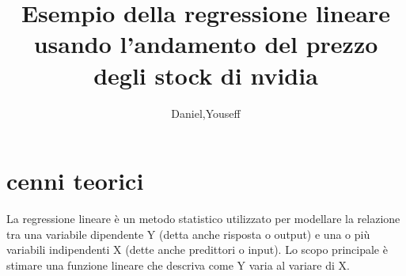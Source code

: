\documentclass[12pt]{article}
\author{Daniel,Youseff}
\title{Esempio della regressione lineare usando l'andamento del prezzo degli stock di nvidia}
\begin{document}
\maketitle
\section{cenni teorici}
La regressione lineare è un metodo statistico utilizzato per modellare la relazione tra una variabile dipendente
Y (detta anche risposta o output) e una o più variabili indipendenti 
X (dette anche predittori o input). Lo scopo principale è stimare una funzione lineare che descriva come Y varia al variare di X.
\end{document}
